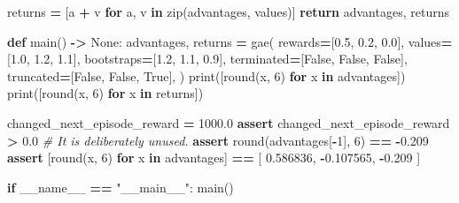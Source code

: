 \documentclass[
  american,
  11pt,
  letterpaper,
]{article}
\newenvironment{Shaded}{\begin{snugshade}}{\end{snugshade}}
\newcommand{\BuiltInTok}[1]{#1}
\newcommand{\CommentTok}[1]{\textcolor[rgb]{0.56,0.35,0.01}{\textit{#1}}}
\newcommand{\ControlFlowTok}[1]{\textcolor[rgb]{0.13,0.29,0.53}{\textbf{#1}}}
\newcommand{\DecValTok}[1]{\textcolor[rgb]{0.00,0.00,0.81}{#1}}
\newcommand{\FloatTok}[1]{\textcolor[rgb]{0.00,0.00,0.81}{#1}}
\newcommand{\KeywordTok}[1]{\textcolor[rgb]{0.13,0.29,0.53}{\textbf{#1}}}
\newcommand{\NormalTok}[1]{#1}
\newcommand{\OperatorTok}[1]{\textcolor[rgb]{0.81,0.36,0.00}{\textbf{#1}}}
\newcommand{\StringTok}[1]{\textcolor[rgb]{0.31,0.60,0.02}{#1}}
\newcommand{\VariableTok}[1]{\textcolor[rgb]{0.00,0.00,0.00}{#1}}
\renewenvironment{Shaded}{\par\smallskip}{\par\smallskip}
\begin{document}
\begin{Shaded}
\begin{Highlighting}[]
\NormalTok{    returns }\OperatorTok{=}\NormalTok{ [a }\OperatorTok{+}\NormalTok{ v }\ControlFlowTok{for}\NormalTok{ a, v }\KeywordTok{in} \BuiltInTok{zip}\NormalTok{(advantages, values)]}
    \ControlFlowTok{return}\NormalTok{ advantages, returns}


\KeywordTok{def}\NormalTok{ main() }\OperatorTok{{-}\textgreater{}} \VariableTok{None}\NormalTok{:}
\NormalTok{    advantages, returns }\OperatorTok{=}\NormalTok{ gae(}
\NormalTok{        rewards}\OperatorTok{=}\NormalTok{[}\FloatTok{0.5}\NormalTok{, }\FloatTok{0.2}\NormalTok{, }\FloatTok{0.0}\NormalTok{],}
\NormalTok{        values}\OperatorTok{=}\NormalTok{[}\FloatTok{1.0}\NormalTok{, }\FloatTok{1.2}\NormalTok{, }\FloatTok{1.1}\NormalTok{],}
\NormalTok{        bootstraps}\OperatorTok{=}\NormalTok{[}\FloatTok{1.2}\NormalTok{, }\FloatTok{1.1}\NormalTok{, }\FloatTok{0.9}\NormalTok{],}
\NormalTok{        terminated}\OperatorTok{=}\NormalTok{[}\VariableTok{False}\NormalTok{, }\VariableTok{False}\NormalTok{, }\VariableTok{False}\NormalTok{],}
\NormalTok{        truncated}\OperatorTok{=}\NormalTok{[}\VariableTok{False}\NormalTok{, }\VariableTok{False}\NormalTok{, }\VariableTok{True}\NormalTok{],}
\NormalTok{    )}
    \BuiltInTok{print}\NormalTok{([}\BuiltInTok{round}\NormalTok{(x, }\DecValTok{6}\NormalTok{) }\ControlFlowTok{for}\NormalTok{ x }\KeywordTok{in}\NormalTok{ advantages])}
    \BuiltInTok{print}\NormalTok{([}\BuiltInTok{round}\NormalTok{(x, }\DecValTok{6}\NormalTok{) }\ControlFlowTok{for}\NormalTok{ x }\KeywordTok{in}\NormalTok{ returns])}

\NormalTok{    changed\_next\_episode\_reward }\OperatorTok{=} \FloatTok{1000.0}
    \ControlFlowTok{assert}\NormalTok{ changed\_next\_episode\_reward }\OperatorTok{\textgreater{}} \FloatTok{0.0}  \CommentTok{\# It is deliberately unused.}
    \ControlFlowTok{assert} \BuiltInTok{round}\NormalTok{(advantages[}\OperatorTok{{-}}\DecValTok{1}\NormalTok{], }\DecValTok{6}\NormalTok{) }\OperatorTok{==} \OperatorTok{{-}}\FloatTok{0.209}
    \ControlFlowTok{assert}\NormalTok{ [}\BuiltInTok{round}\NormalTok{(x, }\DecValTok{6}\NormalTok{) }\ControlFlowTok{for}\NormalTok{ x }\KeywordTok{in}\NormalTok{ advantages] }\OperatorTok{==}\NormalTok{ [}
        \FloatTok{0.586836}\NormalTok{, }\OperatorTok{{-}}\FloatTok{0.107565}\NormalTok{, }\OperatorTok{{-}}\FloatTok{0.209}
\NormalTok{    ]}


\ControlFlowTok{if} \VariableTok{\_\_name\_\_} \OperatorTok{==} \StringTok{"\_\_main\_\_"}\NormalTok{:}
\NormalTok{    main()}
\end{Highlighting}
\end{Shaded}
\end{document}
